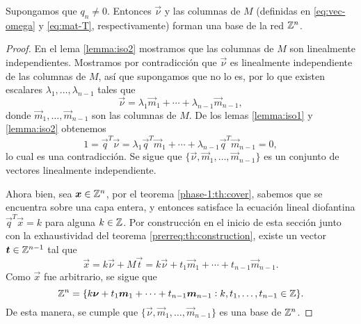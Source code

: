 \begin{theorem}
	\label{th:lattice}
	Supongamos que $q_n \neq 0$. Entonces $\vec{\nu}$ y las columnas de $M$
	(definidas en \eqref{eq:vec-omega} y \eqref{eq:mat-T}, respectivamente)
	forman una base de la red $\mathbb{Z}^n$.
\end{theorem}
\begin{proof}
	En el lema \ref{lemma:iso2} mostramos que las columnas de $M$ son linealmente independientes.
	Mostramos por contradicción que $\vec{\nu}$ es linealmente independiente de las columnas de
	$M$, así que supongamos que no lo es, por lo que existen escalares $\lambda_1, \ldots,
	\lambda_{n-1}$ tales que
	\begin{equation*}
		\vec{\nu} = \lambda_1 \vec{m}_1 + \cdots + \lambda_{n-1} \vec{m}_{n-1},
	\end{equation*}
	donde $\vec{m}_1, \ldots, \vec{m}_{n-1}$ son las columnas de $M$. De los lemas \ref{lemma:iso1}
	y \ref{lemma:iso2} obtenemos
	\begin{equation*}
		1 = \vec{q}^T\vec{\nu} = \lambda_1 \vec{q}^T\vec{m}_1 + \cdots + \lambda_{n-1}
		\vec{q}^T\vec{m}_{n-1} = 0,
	\end{equation*}
	lo cual es una contradicción. Se sigue que $\lbrace \vec{\nu}, \vec{m}_1, \ldots,
	\vec{m}_{n-1}\rbrace$ es un conjunto de vectores linealmente independiente.

	Ahora bien, sea $\boldsymbol{x} \in \mathbb{Z}^n$, por el teorema \ref{phase-1:th:cover}, sabemos que se
	encuentra sobre una capa entera, y entonces satisface la ecuación lineal diofantina
	$\vec{q}^T\vec{x} = k$ para alguna $k \in \mathbb{Z}$. Por construcción en el inicio de esta sección junto
	con la exhaustividad del teorema \ref{prerreq:th:construction}, existe un vector $\boldsymbol{t} \in
	\mathbb{Z}^{n-1}$ tal que
	\begin{equation*}
		\vec{x} = k\vec{\nu} + M\vec{t} = k\vec{\nu} + t_1\vec{m}_1 + \cdots +
		t_{n-1}\vec{m}_{n-1}.
	\end{equation*}
	Como $\vec{x}$ fue arbitrario, se sigue que
	\begin{equation*}
		\mathbb{Z}^n = \lbrace
		k\boldsymbol{\nu} + t_1\boldsymbol{m}_1 + \cdots + t_{n-1}\boldsymbol{m}_{n-1}
		\vcentcolon k, t_1, \ldots, t_{n-1} \in \mathbb{Z}
		\rbrace.
	\end{equation*}
	De esta manera, se cumple que $\lbrace \vec{\nu}, \vec{m}_1, \ldots, \vec{m}_{n-1}\rbrace$ es
	una base de $\mathbb{Z}^n$.
\end{proof}

